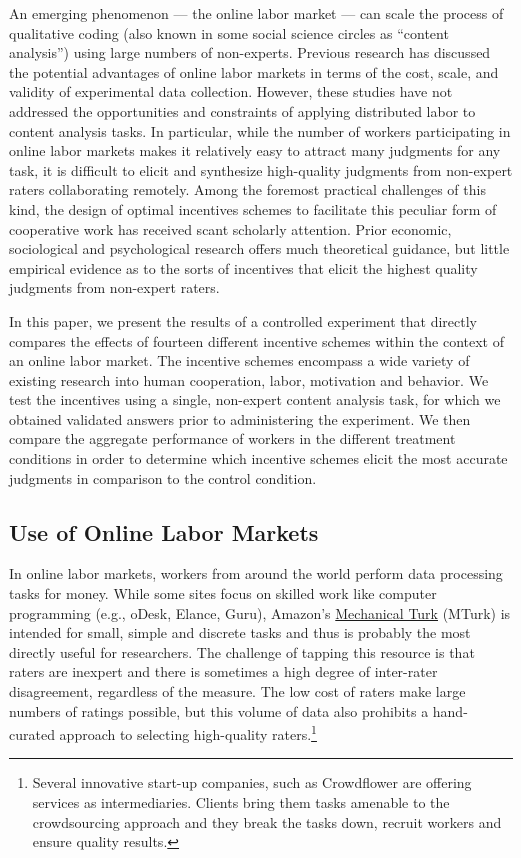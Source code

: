 \documentclass{cscw2010}
\begin{document}
An emerging phenomenon --- the online labor market --- can scale the
process of qualitative coding (also known in some social science
circles as ``content analysis'') using large numbers of
non-experts. Previous research has discussed the potential advantages
of online labor markets in terms
of the cost, scale, and validity of experimental
data collection.\cite{hortonZeck2010} However, these studies have not
addressed the opportunities and constraints of applying distributed
labor to content analysis tasks. In particular, while the number of
workers participating in online labor  markets makes it relatively easy to attract many
judgments for any task, it is difficult to elicit
and synthesize high-quality judgments from non-expert raters
collaborating remotely. Among the
foremost practical challenges of this kind, the design of optimal
incentives schemes to facilitate this peculiar form of cooperative
work has received scant scholarly attention. Prior economic,
sociological and psychological research offers much theoretical
guidance, but little empirical evidence as to the sorts of incentives
that elicit the highest quality judgments from non-expert raters. 

In this paper, we present the results of a controlled experiment that directly compares the effects of fourteen different incentive schemes within the context of an online labor market. The incentive schemes encompass a wide variety of existing research into human cooperation, labor, motivation and behavior. We test the incentives using a single, non-expert content analysis task, for which we obtained validated answers prior to administering the experiment. We then compare the aggregate performance of workers in the different treatment conditions in order to determine which incentive schemes elicit the most accurate judgments in comparison to the control condition. 

\subsection{Use of Online Labor Markets}
In online labor markets, workers from around the world perform data
processing tasks for money. While some sites focus on skilled work
like computer programming (e.g., oDesk, Elance, Guru), Amazon's
\href{https://www.mturk.com/mturk/welcome}{Mechanical Turk} (MTurk) is
intended for small, simple and discrete tasks and thus is probably the
most directly useful for researchers. The challenge of tapping this
resource is that raters are inexpert and there is sometimes a high
degree of inter-rater disagreement, regardless of the measure.  The
low cost of raters make large numbers of ratings possible, but this
volume of data also prohibits a hand-curated approach to selecting
high-quality raters.\footnote{Several innovative start-up companies,
  such as Crowdflower are offering services as intermediaries. Clients
  bring them tasks amenable to the crowdsourcing approach and they
  break the tasks down, recruit workers and ensure quality results.}
\end{document}
